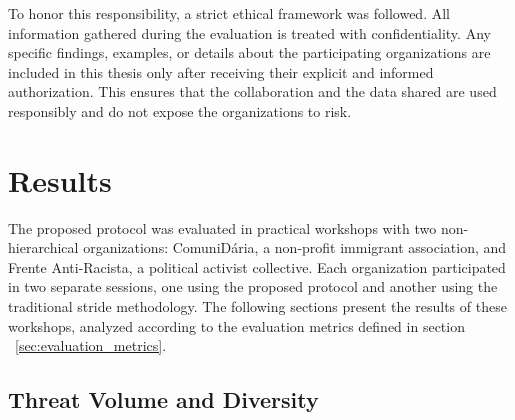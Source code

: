 To honor this responsibility, a strict ethical framework was followed. All
information gathered during the evaluation is treated with
confidentiality. Any specific findings, examples, or details about the
participating organizations are included in this thesis only after receiving
their explicit and informed authorization. This ensures that the collaboration
and the data shared are used responsibly and do not expose the organizations to
risk.


\section{Results}
\label{sec:results}

The proposed protocol was evaluated in practical workshops with two non-hierarchical
organizations: ComuniDária, a non-profit immigrant association, and Frente Anti-Racista,
a political activist collective. Each organization participated in two separate sessions,
one using the proposed protocol and another using the traditional \gls{stride} methodology.
The following sections present the results of these workshops, analyzed according to the
evaluation metrics defined in section ~\ref{sec:evaluation_metrics}.

\subsection{Threat Volume and Diversity}
\label{subsec:threat_volumediversity}



